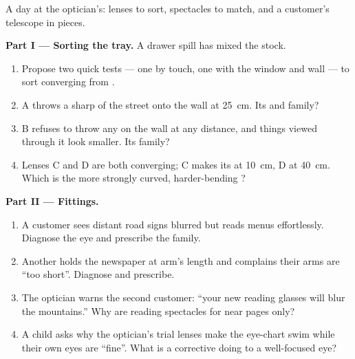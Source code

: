 \begin{problem}\label{pb:g8:lenses-images:1}
A day at the optician's: lenses to sort, spectacles to
match, and a customer's telescope in pieces.

\medskip\noindent\textbf{Part I --- Sorting the tray.}
A drawer spill has mixed the stock.
\begin{enumerate}
  \item Propose two quick tests --- one by touch, one with
        the window and wall --- to sort converging from
        .
  \item {} A throws a sharp  of the street onto the
        wall at \qty{25}{cm}. Its  and family?
  \item {} B refuses to throw any  on the wall at any
        distance, and things viewed through it look smaller.
        Its family?
  \item Lenses C and D are both converging; C makes its
         at \qty{10}{cm}, D at \qty{40}{cm}.
        Which is the more strongly curved, harder-bending
        ?
\end{enumerate}

\medskip\noindent\textbf{Part II --- Fittings.}
\begin{enumerate}[resume]
  \item A customer sees distant road signs blurred but reads
        menus effortlessly. Diagnose the eye and prescribe
        the family.
  \item Another holds the newspaper at arm's length and
        complains their arms are ``too short''. Diagnose and
        prescribe.
  \item The optician warns the second customer: ``your new
        reading glasses will blur the mountains.'' Why are
        reading spectacles for near pages only?
  \item A child asks why the optician's trial lenses make
        the eye-chart swim while their own eyes are
        ``fine''. What is a corrective  doing to a
        well-focused eye?
\end{enumerate}


\end{problem}
